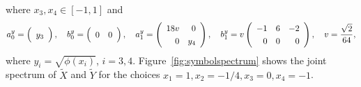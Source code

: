 \documentclass[12pt,a4paper]{article}
\begin{document}
where $x_3, x_4 \in [-1, 1]$ and
\begin{equation*}
a_0^y = 
\left(
\begin{array}{c}
y_3
\end{array}
\right), \quad
b_0^y = 
\left(
\begin{array}{c c}
0 & 0
\end{array}
\right), \quad
a_1^y = 
\left(
\renewcommand{\arraystretch}{1.25}
\begin{array}{r r}
18v & 0 \\
0 & y_4
\end{array}
\right), \quad
b_1^y = 
v\left(
\renewcommand{\arraystretch}{1.25}
\begin{array}{r r r}
-1 & 6 & -2 \\
0 & 0 & 0
\end{array}
\right), \quad v = \frac{\sqrt{2}}{64},
\end{equation*}
where $y_i = \sqrt{\phi(x_i)}$, $i = 3, 4$. Figure~\ref{fig:symbolspectrum} shows the joint spectrum of $\widetilde{X}$ and $\widetilde{Y}$ for the choices $x_1 = 1, x_2 = -1/4, x_3 = 0, x_4 = -1$.
\end{document}
